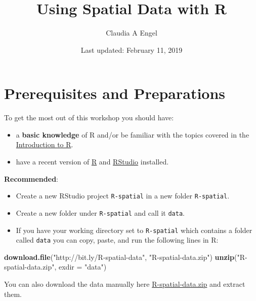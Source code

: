 \documentclass[]{book}
\title{Using Spatial Data with R}
\author{Claudia A Engel}
\date{Last updated: February 11, 2019}
\newenvironment{Shaded}{\begin{snugshade}}{\end{snugshade}}
\newcommand{\KeywordTok}[1]{\textcolor[rgb]{0.13,0.29,0.53}{\textbf{#1}}}
\newcommand{\DataTypeTok}[1]{\textcolor[rgb]{0.13,0.29,0.53}{#1}}
\newcommand{\StringTok}[1]{\textcolor[rgb]{0.31,0.60,0.02}{#1}}
\newcommand{\NormalTok}[1]{#1}
\providecommand{\tightlist}{%
  \setlength{\itemsep}{0pt}\setlength{\parskip}{0pt}}
\begin{document}
\maketitle

{
\setcounter{tocdepth}{1}
\tableofcontents
}
\chapter*{Prerequisites and
Preparations}\label{prerequisites-and-preparations}

To get the most out of this workshop you should have:

\begin{itemize}
\tightlist
\item
  a \textbf{basic knowledge} of R and/or be familiar with the topics
  covered in the \href{https://cengel.github.io/R-intro/}{Introduction
  to R}.
\item
  have a recent version of \href{https://cran.r-project.org/}{R} and
  \href{https://www.rstudio.com/}{RStudio} installed.
\end{itemize}

\textbf{Recommended}:

\begin{itemize}
\item
  Create a new RStudio project \texttt{R-spatial} in a new folder
  \texttt{R-spatial}.
\item
  Create a new folder under \texttt{R-spatial} and call it
  \texttt{data}.
\item
  If you have your working directory set to \texttt{R-spatial} which
  contains a folder called \texttt{data} you can copy, paste, and run
  the following lines in R:
\end{itemize}

\begin{Shaded}
\begin{Highlighting}[]
\KeywordTok{download.file}\NormalTok{(}\StringTok{"http://bit.ly/R-spatial-data"}\NormalTok{, }\StringTok{"R-spatial-data.zip"}\NormalTok{)}
\KeywordTok{unzip}\NormalTok{(}\StringTok{"R-spatial-data.zip"}\NormalTok{, }\DataTypeTok{exdir =} \StringTok{"data"}\NormalTok{)}
\end{Highlighting}
\end{Shaded}

You can also download the data manually here
\href{https://github.com/cengel/R-spatial/raw/master/data/R-spatial-data.zip}{R-spatial-data.zip}
and extract them.
\end{document}
